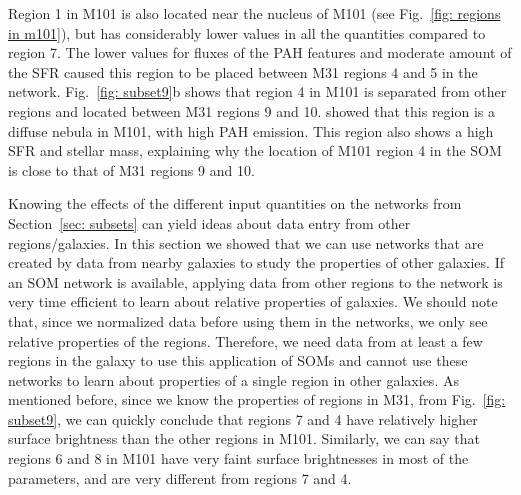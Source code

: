     Region 1 in M101 is also located near the nucleus of M101 (see Fig.~\ref{fig: regions in m101}), but has considerably lower values in all the quantities compared to region 7.
    The lower values for fluxes of the PAH features and moderate amount of the SFR caused this region to be placed between M31 regions 4 and 5 in the network. 
    Fig.~\ref{fig: subset9}b shows that region 4 in M101 is separated from other regions and located between M31 regions 9 and 10.
    \cite{Gordon08} showed that this region is a diffuse nebula in M101, with high PAH emission. 
    This region also shows a high SFR and stellar mass, explaining why the location of M101 region 4 in the SOM is close to that of M31 regions 9 and 10.
    
    Knowing the effects of the different input quantities on the networks from Section~\ref{sec: subsets} can yield ideas about data entry from other regions/galaxies.
    In this section we showed that we can use networks that are created by data from nearby galaxies to study the properties of other galaxies.
    If an SOM network is available, applying data from other regions to the network is very time efficient to learn about relative properties of galaxies.
    We should note that, since we normalized data before using them in the networks, we only see relative properties of the regions.
    Therefore, we need data from at least a few regions in the galaxy to use this application of SOMs and cannot use these networks to learn about properties of a single region in other galaxies.
    As mentioned before, since we know the properties of regions in M31, from Fig.~\ref{fig: subset9}, we can quickly conclude that regions 7 and 4 have relatively higher surface brightness than the other regions in M101. 
    Similarly, we can say that regions 6 and 8 in M101 have very faint surface brightnesses in most of the parameters, and are very different from regions 7 and 4.
    
  
